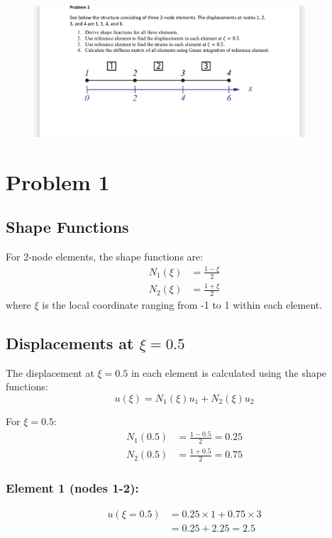 \documentclass[12pt,a4paper]{article}
\begin{document}
\begin{figure}[H]
\centering
\includegraphics[width=0.9\textwidth]{IMG_5525.jpeg}
\end{figure}

\section{Problem 1}

\subsection{Shape Functions}
For 2-node elements, the shape functions are:
\begin{align}
N_1(\xi) &= \frac{1-\xi}{2} \\
N_2(\xi) &= \frac{1+\xi}{2}
\end{align}
where $\xi$ is the local coordinate ranging from -1 to 1 within each element.

\subsection{Displacements at $\xi = 0.5$}
The displacement at $\xi = 0.5$ in each element is calculated using the shape functions:
\begin{equation}
u(\xi) = N_1(\xi)u_1 + N_2(\xi)u_2
\end{equation}

For $\xi = 0.5$:
\begin{align}
N_1(0.5) &= \frac{1-0.5}{2} = 0.25 \\
N_2(0.5) &= \frac{1+0.5}{2} = 0.75
\end{align}

\subsubsection*{Element 1 (nodes 1-2):}
\begin{align}
u(\xi=0.5) &= 0.25 \times 1 + 0.75 \times 3 \\
&= 0.25 + 2.25 = 2.5
\end{align}
\end{document}
